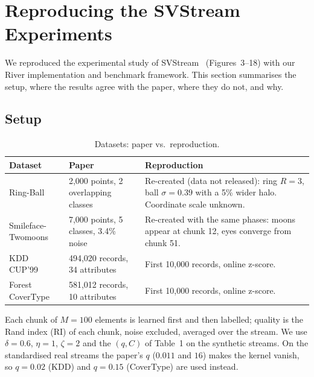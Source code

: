 \section{Reproducing the SVStream Experiments}
\label{sec:svstream_reproduction}

We reproduced the experimental study of SVStream~\cite{wang2013svstream} (Figures~3--18) with our River implementation and benchmark framework. This section summarises the setup, where the results agree with the paper, where they do not, and why.

\subsection{Setup}
\label{subsec:svstream_setup}

\begin{table}[H]
\centering
\caption{Datasets: paper vs.\ reproduction.}
\label{tab:dataset_specs}
\small
\begin{tabularx}{\textwidth}{@{}l L L@{}}
\toprule
\textbf{Dataset} & \textbf{Paper} & \textbf{Reproduction} \\
\midrule
Ring-Ball & 2,000 points, 2 overlapping classes & Re-created (data not released): ring $R=3$, ball $\sigma=0.39$ with a 5\% wider halo. Coordinate scale unknown. \\
Smileface-Twomoons & 7,000 points, 5 classes, 3.4\% noise & Re-created with the same phases: moons appear at chunk 12, eyes converge from chunk 51. \\
KDD CUP'99 & 494,020 records, 34 attributes & First 10,000 records, online z-score. \\
Forest CoverType & 581,012 records, 10 attributes & First 10,000 records, online z-score. \\
\bottomrule
\end{tabularx}
\end{table}

\noindent Each chunk of $M=100$ elements is learned first and then labelled; quality is the Rand index (RI) of each chunk, noise excluded, averaged over the stream. We use $\delta=0.6$, $\eta=1$, $\zeta=2$ and the $(q, C)$ of Table~1 on the synthetic streams. On the standardised real streams the paper's $q$ ($0.011$ and $16$) makes the kernel vanish, so $q=0.02$ (KDD) and $q=0.15$ (CoverType) are used instead.

